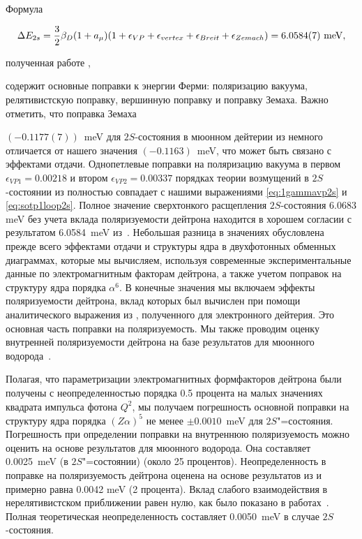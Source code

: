 Формула

\begin{equation}

\label{eq:borie}

\Delta E_{2s}=\frac{3}{2}\beta_D(1+a_\mu)(1+\epsilon_{VP}+\epsilon_{vertex}+\epsilon_{Breit}+\epsilon_{Zemach})=6.0584(7)~\rm meV,

\end{equation}

полученная работе \cite{borie1},

содержит основные поправки к энергии Ферми: поляризацию вакуума, релятивистскую поправку, вершинную поправку и поправку Земаха. Важно отметить, что поправка Земаха

$(-0.1177(7))$~meV для $2S$-состояния в мюонном дейтерии из \cite{borie1} немного отличается от нашего значения $(-0.1163)$~meV, что может быть связано с эффектами отдачи. Однопетлевые поправки на поляризацию вакуума в первом $\epsilon_{VP1}=0.00218$ и втором $\epsilon_{VP2}=0.00337$ порядках теории возмущений в $2S$-состоянии из \cite{borie1} полностью совпадает с нашими выражениями \eqref{eq:1gammavp2s} и \eqref{eq:sotp1loop2s}. Полное значение сверхтонкого расщепления $2S$-состояния 6.0683 meV без учета вклада поляризуемости дейтрона находится в хорошем согласии с результатом 6.0584~meV из~\cite{borie1}. Небольшая разница в значениях обусловлена прежде всего эффектами отдачи и структуры ядра в двухфотонных обменных диаграммах, которые мы вычисляем, используя современные экспериментальные данные по электромагнитным факторам дейтрона, а также учетом поправок на структуру ядра порядка $\alpha^6$. В конечные значения мы включаем эффекты поляризуемости дейтрона, вклад которых был вычислен при помощи аналитического выражения из \cite{ibk}, полученного для электронного дейтерия. Это основная часть поправки на поляризуемость. Мы также проводим оценку внутренней поляризуемости дейтрона на базе результатов для мюонного водорода~\cite{m2006}.



Полагая, что параметризации электромагнитных формфакторов дейтрона были получены с неопределенностью порядка 0.5 процента на малых значениях квадрата импульса фотона $Q^2$, мы получаем погрешность основной поправки на структуру ядра порядка $(Z\alpha)^5$ не менее $\pm 0.0010$~meV для $2S$"=состояния. Погрешность при определении поправки на внутреннюю поляризуемость можно оценить на основе результатов для мюонного водорода. Она составляет 0.0025~meV (в $2S$"=состоянии) (около 25 процентов). Неопределенность в поправке на поляризуемость дейтрона оценена на основе результатов из \cite{ibk} и примерно равна 0.0042 meV (2 процента). Вклад слабого взаимодействия в нерелятивистском приближении равен нулю, как было показано в работах~\cite{egs,eides_weak}. Полная теоретическая неопределенность составляет 0.0050~meV в случае $2S$-состояния.



